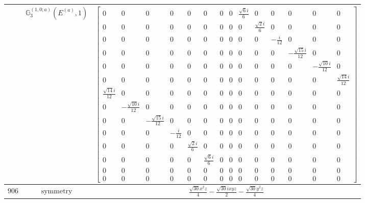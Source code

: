 \documentclass[fleqn,8pt,landscape]{jsarticle}
\begin{document}
\begin{longtable}{ccc}
$  $ & $ \mathbb{G}_{3}^{(1,0;a)}(E^{(a)},1) $ & $ \begin{bmatrix} 0 & 0 & 0 & 0 & 0 & 0 & 0 & 0 & \frac{\sqrt{6} i}{6} & 0 & 0 & 0 & 0 & 0 \\ 0 & 0 & 0 & 0 & 0 & 0 & 0 & 0 & 0 & \frac{\sqrt{2} i}{6} & 0 & 0 & 0 & 0 \\ 0 & 0 & 0 & 0 & 0 & 0 & 0 & 0 & 0 & 0 & - \frac{i}{12} & 0 & 0 & 0 \\ 0 & 0 & 0 & 0 & 0 & 0 & 0 & 0 & 0 & 0 & 0 & - \frac{\sqrt{15} i}{12} & 0 & 0 \\ 0 & 0 & 0 & 0 & 0 & 0 & 0 & 0 & 0 & 0 & 0 & 0 & - \frac{\sqrt{10} i}{12} & 0 \\ 0 & 0 & 0 & 0 & 0 & 0 & 0 & 0 & 0 & 0 & 0 & 0 & 0 & \frac{\sqrt{14} i}{12} \\ \frac{\sqrt{14} i}{12} & 0 & 0 & 0 & 0 & 0 & 0 & 0 & 0 & 0 & 0 & 0 & 0 & 0 \\ 0 & - \frac{\sqrt{10} i}{12} & 0 & 0 & 0 & 0 & 0 & 0 & 0 & 0 & 0 & 0 & 0 & 0 \\ 0 & 0 & - \frac{\sqrt{15} i}{12} & 0 & 0 & 0 & 0 & 0 & 0 & 0 & 0 & 0 & 0 & 0 \\ 0 & 0 & 0 & - \frac{i}{12} & 0 & 0 & 0 & 0 & 0 & 0 & 0 & 0 & 0 & 0 \\ 0 & 0 & 0 & 0 & \frac{\sqrt{2} i}{6} & 0 & 0 & 0 & 0 & 0 & 0 & 0 & 0 & 0 \\ 0 & 0 & 0 & 0 & 0 & \frac{\sqrt{6} i}{6} & 0 & 0 & 0 & 0 & 0 & 0 & 0 & 0 \\ 0 & 0 & 0 & 0 & 0 & 0 & 0 & 0 & 0 & 0 & 0 & 0 & 0 & 0 \\ 0 & 0 & 0 & 0 & 0 & 0 & 0 & 0 & 0 & 0 & 0 & 0 & 0 & 0 \end{bmatrix} $ \\ \hline
$ 906 $ & $ \text{symmetry} $ & $ \frac{\sqrt{30} x^{2} z}{4} - \frac{\sqrt{30} i x y z}{2} - \frac{\sqrt{30} y^{2} z}{4} $ \\

\end{longtable}
\end{document}
